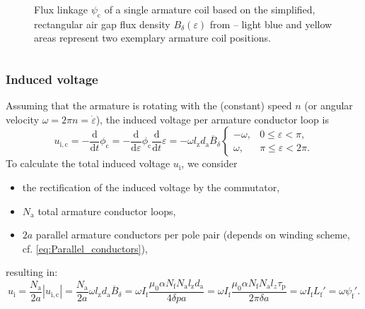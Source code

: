 \begin{frame}
\begin{columns}
\begin{column}{0.55\textwidth}
\begin{figure}
			\caption{Flux linkage $\psi_\mathrm{c}$ of a single armature coil based on the simplified, rectangular air gap flux density $B_\delta(\varepsilon)$  from  -- light blue and yellow areas represent two exemplary armature coil positions.}
			\label{fig:Flux_density_and_linkage}
		\end{figure}
	\end{column}
	\end{columns}
\end{frame}

\begin{frame}
	\frametitle{Induced voltage}
	Assuming that the armature is rotating with the (constant) speed $n$ (or angular velocity $\omega = 2 \pi n=\dot{\varepsilon}$), the induced voltage per armature conductor loop is
	\begin{equation}
			u_\mathrm{i,c} = - \frac{\mathrm{d}}{\mathrm{d}t} \phi_\mathrm{c} = - \frac{\mathrm{d}}{\mathrm{d}\varepsilon} \phi_\mathrm{c} \frac{\mathrm{d}}{\mathrm{d}t}\varepsilon = - \omega l_\mathrm{z}d_\mathrm{a}\overline{B}_\delta \begin{cases}
				-\omega, &  0 \leq \varepsilon < \pi,\\
				\omega, &  \pi \leq \varepsilon < 2\pi.
			\end{cases}
		\label{eq:Induced_voltage_per_conductor}
	\end{equation}
	To calculate the total induced voltage $u_\mathrm{i}$, we consider
	\begin{itemize}
	   \item the rectification of the induced voltage by the commutator, \pause 		
	   \item $N_\mathrm{a}$ total armature conductor loops, \pause
	   \item $2 a$ parallel armature conductors per pole pair (depends on winding scheme, cf. \eqref{eq:Parallel_conductors}), \pause
	\end{itemize}
	resulting in: \pause
	\begin{equation}
			u_\mathrm{i} = \frac{N_\mathrm{a}}{2 a} |u_\mathrm{i,c}| = \frac{N_\mathrm{a}}{2 a}\omega l_\mathrm{z}d_\mathrm{a}\overline{B}_\delta = \omega I_\mathrm{f}\frac{\mu_0 \alpha N_\mathrm{f} N_\mathrm{a} l_\mathrm{z} d_\mathrm{a}}{4 \delta p a} =  \omega I_\mathrm{f} \frac{\mu_0 \alpha N_\mathrm{f} N_\mathrm{a} l_z \tau_\mathrm{p}}{2 \pi  \delta a} =\omega I_\mathrm{f} L_\mathrm{f}' = \omega  \psi_\mathrm{f}'.
	\end{equation}
\end{frame}


